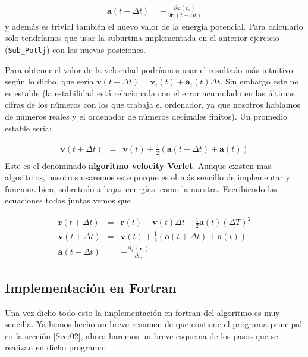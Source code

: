 \documentclass[11pt]{article} %
\newcommand{\parentesis}[1]{\left( #1  \right)}
\newcommand{\parciales}[2]{\frac{\partial #1}{\partial #2}}
\newcommand{\an}{\mathbf{a}}
\newcommand{\rn}{\mathbf{r}}
\newcommand{\vn}{\mathbf{v}}
\begin{document}
\begin{eqnarray}
	\an (t+\Delta t) = - \parciales{\varphi (\rn_i)}{\rn_{i}(t+\Delta t)}
\end{eqnarray}
y además es trivial también el nuevo valor de la energía potencial. Para calcularlo solo tendríamos que usar la suburtina implementada en el anterior ejercicio (\texttt{Sub\_Potlj}) con las nuevas posiciones. 

Para obtener el valor de la velocidad podríamos usar el resultado más intuitivo según lo dicho, que sería $\vn(t+\Delta t) = \vn_i (t) + \an_i (t) \Delta t$. Sin embargo este no es estable (la estabilidad está relacionada con el error acumulado en las últimas cifras de los números con los que trabaja el ordenador, ya que nosotros hablamos de números reales y el ordenador de números decimales finitos). Un promedio estable sería:

\begin{eqnarray}
	\vn(t+\Delta t) & = & \vn(t) + \frac{1}{2} \parentesis{\an(t+\Delta t)+ \an(t)} \\
\end{eqnarray}
Este es el denominado \textbf{algoritmo velocity Verlet}. Aunque existen mas algoritmos, nosotros usaremos este porque es el más sencillo de implementar y funciona bien, sobretodo a bajas energías, como la nuestra. Escribiendo las ecuaciones todas juntas vemos que

\begin{eqnarray*}
	\rn(t+\Delta t) & = & \rn(t) + \vn(t) \Delta t + \frac{1}{2} \an (t) (\Delta T)^2 \\
	\vn(t+\Delta t) & = & \vn(t) + \frac{1}{2} \parentesis{\an(t+\Delta t)+ \an(t)} \\
	\an(t+\Delta t) & = &  - \parciales{\varphi(\rn_i)}{\rn_i}
\end{eqnarray*}

\subsection{Implementación en Fortran}

Una vez dicho todo esto la implementación en fortran del algoritmo es muy sencilla. Ya hemos hecho un breve resumen de que contiene el programa principal en la sección \ref{Sec:02}, ahora haremos un breve esquema de los pasos que se realizan en dicho programa:
\end{document}
